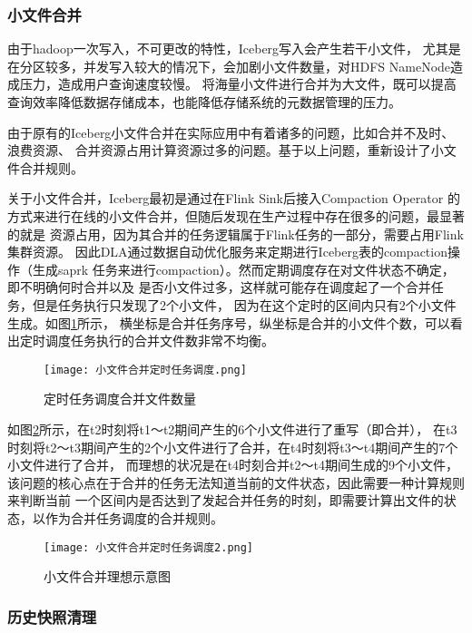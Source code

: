 \subsubsection{小文件合并}

由于hadoop一次写入，不可更改的特性，Iceberg写入会产生若干小文件，
尤其是在分区较多，并发写入较大的情况下，会加剧小文件数量，对HDFS NameNode造成压力，造成用户查询速度较慢\cite{35}。
将海量⼩⽂件进⾏合并为⼤⽂件，既可以提高查询效率降低数据存储成本，也能降低存储系统的元数据管理的压力。

由于原有的Iceberg小文件合并在实际应用中有着诸多的问题，比如合并不及时、浪费资源、
合并资源占用计算资源过多的问题。基于以上问题，重新设计了小文件合并规则。

关于小文件合并，Iceberg最初是通过在Flink Sink后接入Compaction Operator
的方式来进行在线的小文件合并，但随后发现在生产过程中存在很多的问题，最显著的就是
资源占用，因为其合并的任务逻辑属于Flink任务的一部分，需要占用Flink集群资源。
因此DLA通过数据自动优化服务来定期进行Iceberg表的compaction操作（生成saprk
任务来进行compaction）。然而定期调度存在对文件状态不确定，即不明确何时合并以及
是否小文件过多，这样就可能存在调度起了一个合并任务，但是任务执行只发现了2个小文件，
因为在这个定时的区间内只有2个小文件生成。如图\ref{fig:小文件合并定时任务调度}所示，
横坐标是合并任务序号，纵坐标是合并的小文件个数，可以看出定时调度任务执行的合并文件数非常不均衡。

\begin{figure}[H]
  \centering
  \texttt{[image: 小文件合并定时任务调度.png]}
  \caption{定时任务调度合并文件数量}
  \label{fig:小文件合并定时任务调度}
\end{figure}

如图\ref{fig:小文件合并理想示意图}所示，在t2时刻将t1～t2期间产生的6个小文件进行了重写（即合并），
在t3时刻将t2～t3期间产生的2个小文件进行了合并，在t4时刻将t3～t4期间产生的7个小文件进行了合并，
而理想的状况是在t4时刻合并t2～t4期间生成的9个小文件，
该问题的核心点在于合并的任务无法知道当前的文件状态，因此需要一种计算规则来判断当前
一个区间内是否达到了发起合并任务的时刻，即需要计算出文件的状态，以作为合并任务调度的合并规则。

\begin{figure}[H]
  \centering
  \texttt{[image: 小文件合并定时任务调度2.png]}
  \caption{小文件合并理想示意图}
  \label{fig:小文件合并理想示意图}
\end{figure}

\subsubsection{历史快照清理}

